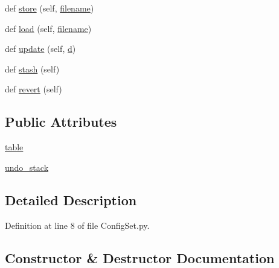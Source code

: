 \begin{DoxyCompactItemize}
\item 
def \hyperlink{classwaflib_1_1_config_set_1_1_config_set_a40cccbc7de2812a306847ee5fed9e546}{store} (self, \hyperlink{test__portburn_8cpp_a7efa5e9c7494c7d4586359300221aa5d}{filename})
\item 
def \hyperlink{classwaflib_1_1_config_set_1_1_config_set_aa199c23836c9459d17ecd85a6cd08297}{load} (self, \hyperlink{test__portburn_8cpp_a7efa5e9c7494c7d4586359300221aa5d}{filename})
\item 
def \hyperlink{classwaflib_1_1_config_set_1_1_config_set_a298717d62f84c251b97ee02c7c70cb92}{update} (self, \hyperlink{poly-fir_8h_a2530554172d8629149ec56816eeaa947}{d})
\item 
def \hyperlink{classwaflib_1_1_config_set_1_1_config_set_a9f99d3620bcd107a604135ee4e6efb96}{stash} (self)
\item 
def \hyperlink{classwaflib_1_1_config_set_1_1_config_set_a95b43d10b5c41e35677afb969d03d6bd}{revert} (self)
\end{DoxyCompactItemize}
\subsection*{Public Attributes}
\begin{DoxyCompactItemize}
\item 
\hyperlink{classwaflib_1_1_config_set_1_1_config_set_a80c48ea963cc949456ea52c8c6d968c9}{table}
\item 
\hyperlink{classwaflib_1_1_config_set_1_1_config_set_a55c2c25b13aa6ee4bccebe58af4aadc0}{undo\+\_\+stack}
\end{DoxyCompactItemize}


\subsection{Detailed Description}


Definition at line 8 of file Config\+Set.\+py.



\subsection{Constructor \& Destructor Documentation}
